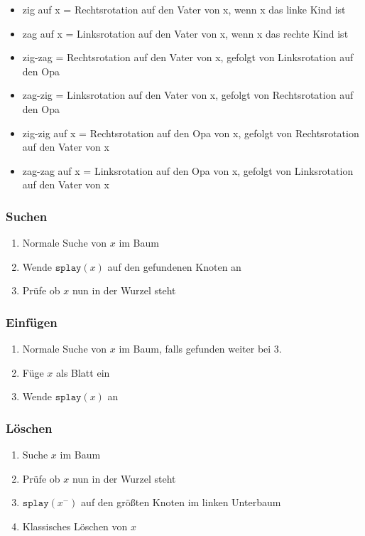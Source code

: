 \documentclass[11pt]{scrartcl}
\begin{document}
\begin{itemize}
	\item zig auf x = Rechtsrotation auf den Vater von x, wenn x das linke Kind ist
    \item zag auf x = Linksrotation auf den Vater von x, wenn x das rechte Kind ist
    \item zig-zag = Rechtsrotation auf den Vater von x, gefolgt von Linksrotation auf den Opa
    \item zag-zig = Linksrotation auf den Vater von x, gefolgt von Rechtsrotation auf den Opa
    \item zig-zig auf x = Rechtsrotation auf den Opa von x, gefolgt von Rechtsrotation auf den Vater von x
    \item zag-zag auf x = Linksrotation auf den Opa von x, gefolgt von Linksrotation auf den Vater von x
\end{itemize}

\subsubsection{Suchen}
\begin{enumerate}
	\item Normale Suche von $x$ im Baum
    \item Wende $\texttt{splay}(x)$ auf den gefundenen Knoten an
    \item Prüfe ob $x$ nun in der Wurzel steht
\end{enumerate}

\subsubsection{Einfügen}
\begin{enumerate}
	\item Normale Suche von $x$ im Baum, falls gefunden weiter bei 3.
    \item Füge $x$ als Blatt ein
    \item Wende $\texttt{splay}(x)$ an
\end{enumerate}

\subsubsection{Löschen}
\begin{enumerate}
	\item Suche $x$ im Baum
    \item Prüfe ob $x$ nun in der Wurzel steht
    \item $\texttt{splay}(x^-)$ auf den größten Knoten im linken Unterbaum
    \item Klassisches Löschen von $x$
\end{enumerate}
\end{document}

